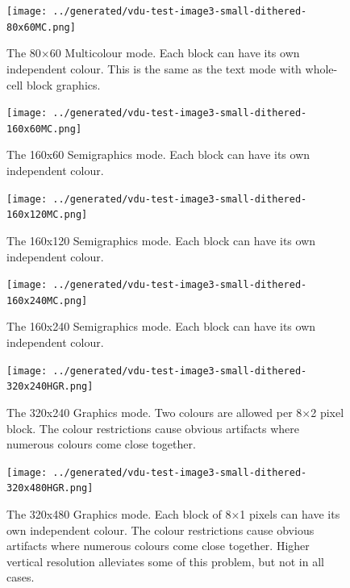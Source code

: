   
  \begin{figure}[p]
    \centering
    \texttt{[image: ../generated/vdu-test-image3-small-dithered-80x60MC.png]}%
    \caption[80×60 Multicolour mode]{\label{fig:vdu:mode-80x60mc}The 80×60 Multicolour mode.
      Each block can have its own independent colour.
      This is the same as the text mode with whole-cell block graphics.
    }
  \end{figure}
  
  \begin{figure}[p]
    \centering
    \texttt{[image: ../generated/vdu-test-image3-small-dithered-160x60MC.png]}%
    \caption[160×60 Semigraphics mode]{\label{fig:vdu:mode-160x60}The 160x60 Semigraphics mode.
      Each block can have its own independent colour.
    }
  \end{figure}
  
  \begin{figure}[p]
    \centering
    \texttt{[image: ../generated/vdu-test-image3-small-dithered-160x120MC.png]}%
    \caption[160×120 Semigraphics mode]{\label{fig:vdu:mode-160x120mc}The 160x120 Semigraphics mode.
      Each block can have its own independent colour.
    }
  \end{figure}
  
  \begin{figure}[p]
    \centering
    \texttt{[image: ../generated/vdu-test-image3-small-dithered-160x240MC.png]}%
    \caption[160×240 Semigraphics mode]{\label{fig:vdu:mode-160x240mc}The 160x240
      Semigraphics mode.  Each block can have its own independent colour.}
  \end{figure}
  
  \begin{figure}[p]
    \centering
    \texttt{[image: ../generated/vdu-test-image3-small-dithered-320x240HGR.png]}%
    \caption[320×240 Graphics mode]{\label{fig:vdu:mode-320x240hgr}The 320x240
      Graphics mode.  Two colours are allowed per 8×2 pixel block.  The colour
      restrictions cause obvious artifacts where numerous colours come close
      together.  }
  \end{figure}
  
  
  \begin{figure}[p]
    \centering
    \texttt{[image: ../generated/vdu-test-image3-small-dithered-320x480HGR.png]}%
    \caption[320×480 Graphics mode]{\label{fig:vdu:mode-320x480hgr}The 320x480 Graphics mode.
      Each block of 8×1 pixels can have its own independent colour.
      The colour restrictions cause obvious artifacts where numerous colours come close together.
      Higher vertical resolution alleviates some of this problem, but not in all cases.
    }
  \end{figure}
  
